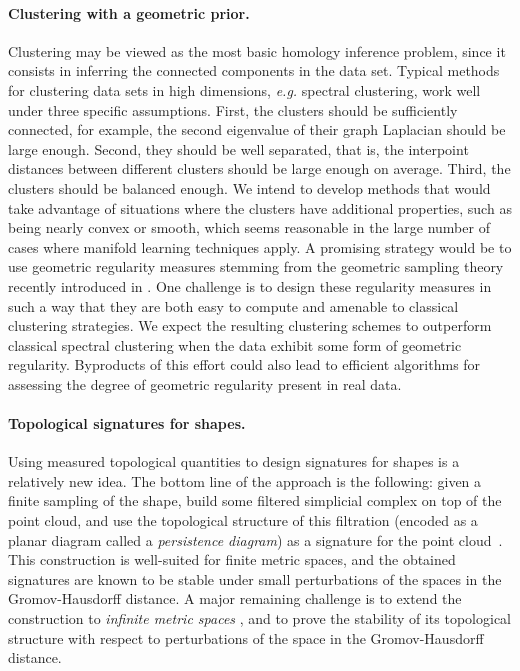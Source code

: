 \paragraph{Clustering with a geometric prior.} 
Clustering may be viewed as the most basic homology inference problem, since it consists in inferring the connected components in the data set. Typical methods for clustering data sets in high dimensions, {\it e.g.} spectral clustering, work well under three specific assumptions. First, the clusters should be sufficiently connected, for example, the second eigenvalue of their graph Laplacian should be large enough. Second, they should be well separated, that is, the interpoint distances between different clusters should be large enough on average. Third, the clusters should be balanced enough. We intend to develop methods that would take advantage of situations where the clusters have additional properties, such as being nearly convex or smooth, which seems reasonable in the large number of cases where manifold learning techniques apply. A promising strategy would be to use geometric regularity measures stemming from the geometric sampling theory recently introduced in \cite{geometrica-ccl09}. One challenge is to design these regularity measures in such a way that they are both easy to compute and amenable to classical clustering strategies. We expect the resulting clustering schemes to outperform classical spectral clustering when the data exhibit some form of geometric regularity. Byproducts of this effort could also lead to efficient algorithms for assessing the degree of geometric regularity present in real data. 



\paragraph{Topological signatures for shapes.}


Using measured topological quantities to design signatures for shapes
is a relatively new idea. The bottom line of the approach is the
following: given a finite sampling of the shape, build some filtered
simplicial complex on top of the point cloud, and use the topological
structure of this filtration (encoded as a planar diagram called a
{\em persistence diagram}) as a signature for the point
cloud~\cite{ccgmo-ghsssp-09, socg-pbsds-10}. This construction is
well-suited for finite metric spaces, and the obtained signatures are
known to be stable under small perturbations of the spaces in the
Gromov-Hausdorff distance.  
A major remaining challenge is to extend the
construction to {\em infinite metric spaces} , and to prove the stability of
its topological structure with respect to perturbations of the space
in the Gromov-Hausdorff distance.

